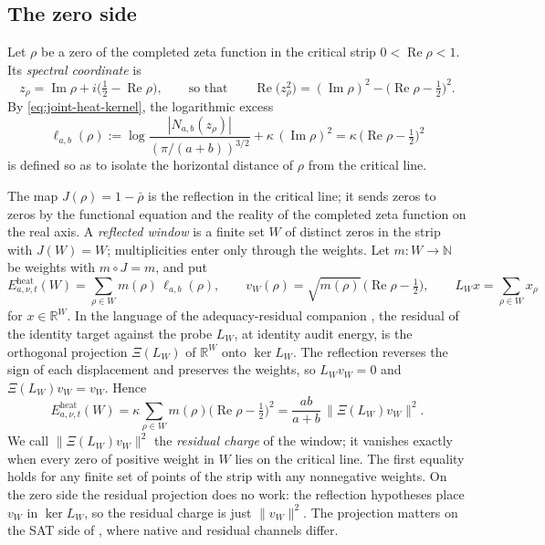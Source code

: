 \subsection{The zero side}

Let \(\rho\) be a zero of the completed zeta function in the critical
strip \(0<\operatorname{Re}\rho<1\).  Its \emph{spectral coordinate} is
\[
  z_{\rho}=\operatorname{Im}\rho+i\bigl(\tfrac12-\operatorname{Re}\rho\bigr),
  \qquad\text{so that}\qquad
  \operatorname{Re}\bigl(z_{\rho}^{2}\bigr)
  =(\operatorname{Im}\rho)^{2}-\bigl(\operatorname{Re}\rho-\tfrac12\bigr)^{2}.
\]
By \eqref{eq:joint-heat-kernel}, the logarithmic excess
\[
  \ell_{a,b}(\rho)
  :=\log\frac{|N_{a,b}(z_{\rho})|}{(\pi/(a+b))^{3/2}}
        +\kappa\,(\operatorname{Im}\rho)^{2}
  =\kappa\,\bigl(\operatorname{Re}\rho-\tfrac12\bigr)^{2}
\]
is defined so as to isolate the horizontal distance of \(\rho\) from
the critical line.

The map \(J(\rho)=1-\bar\rho\) is the reflection in the critical line;
it sends zeros to zeros by the functional equation and the reality of
the completed zeta function on the real axis.  A \emph{reflected
window} is a finite set \(W\) of distinct zeros in the strip with
\(J(W)=W\); multiplicities enter only through the weights.
Let \(m:W\to\mathbb N\) be weights with \(m\circ J=m\), and put
\[
  E^{\mathrm{heat}}_{a,\nu,t}(W)=\sum_{\rho\in W}m(\rho)\,\ell_{a,b}(\rho),
  \qquad
  v_{W}(\rho)=\sqrt{m(\rho)}\,\bigl(\operatorname{Re}\rho-\tfrac12\bigr),
  \qquad
  L_{W}x=\sum_{\rho\in W}x_{\rho}
\]
for \(x\in\mathbb R^{W}\).  In the language of the adequacy-residual
companion \cite{Tsiokos2026XiCompanion}, the residual of the identity
target against the probe \(L_{W}\), at identity audit energy, is the
orthogonal projection \(\Xi(L_{W})\) of \(\mathbb R^{W}\) onto
\(\ker L_{W}\).  The reflection reverses the sign of each displacement
and preserves the weights, so \(L_{W}v_{W}=0\) and
\(\Xi(L_{W})v_{W}=v_{W}\).  Hence
\begin{equation}
\label{eq:joint-heat-xi}
  E^{\mathrm{heat}}_{a,\nu,t}(W)
    =\kappa\sum_{\rho\in W}m(\rho)\bigl(\operatorname{Re}\rho-\tfrac12\bigr)^{2}
  =\frac{ab}{a+b}\,\bigl\|\Xi(L_{W})v_{W}\bigr\|^{2}.
\end{equation}
We call \(\|\Xi(L_{W})v_{W}\|^{2}\) the \emph{residual charge} of the
window; it vanishes exactly when every zero of positive weight in \(W\)
lies on the critical line.  The first equality holds for any finite set
of points of the strip with any nonnegative weights.  On the zero side
the residual projection does no work: the reflection hypotheses place
\(v_{W}\) in \(\ker L_{W}\), so the residual charge is just
\(\|v_{W}\|^{2}\).  The projection matters on the SAT side of
, where native and residual channels differ.


